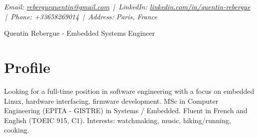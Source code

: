 \documentclass[9pt,a4paper]{article}
\newcommand{\namefont}{\fontsize{18}{22}\selectfont}
\newcommand{\tinyscript}{\fontsize{8}{8}\selectfont}
\begin{document}
\renewcommand\normalsize{\fontsize{10.5}{15}\selectfont}
\normalsize

\begin{center}
  {\tinyscript\itshape
  Email: \href{mailto:reberguequentin@gmail.com}{reberguequentin@gmail.com} \,|\,
  LinkedIn: \href{https://linkedin.com/in/quentin-rebergue}{linkedin.com/in/quentin-rebergue} \,|\,
  Phone: +33658269014 \,|\,
  Address: Paris, France}
\end{center}

\begin{center}
  {\namefont Quentin Rebergue - Embedded Systems Engineer}
\end{center}

\section*{Profile}
\begin{tcolorbox}[mybox2]
Looking for a full-time position in software engineering with a focus on embedded Linux, hardware interfacing, firmware development. MSc in Computer Engineering (EPITA - GISTRE) in Systems / Embedded. Fluent in French and English (TOEIC 915, C1). Interests: watchmaking, music, hiking/running, cooking.
\end{tcolorbox}
\end{document}
